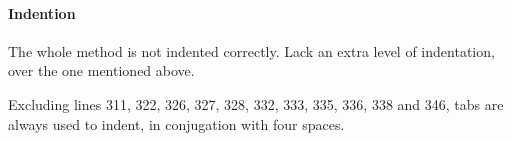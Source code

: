 
\paragraph{Indention}
\begin{itemize}
	\begin{itemize}
			The whole method is not indented correctly.
			Lack an extra level of indentation, over the one mentioned above.
	\end{itemize}
		Excluding lines 311, 322, 326, 327, 328, 332, 333, 335, 336, 338 and 346, tabs are always used to indent, in conjugation with four spaces.
\end{itemize}

